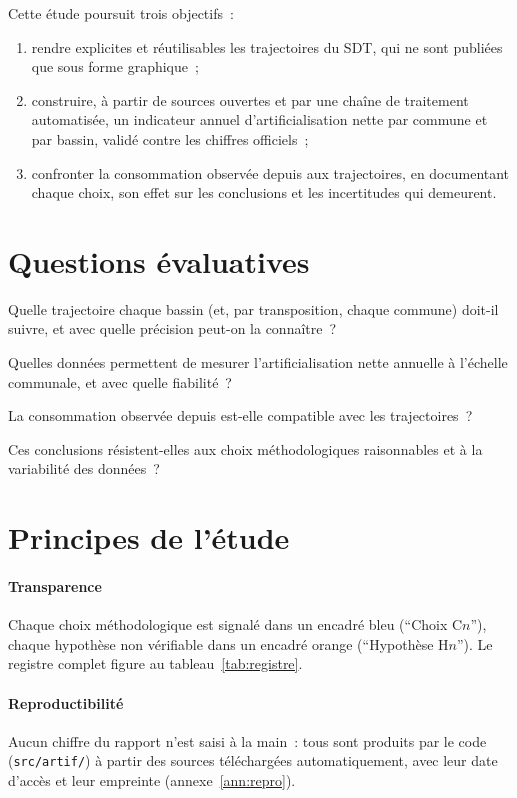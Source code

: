 \documentclass[11pt,a4paper]{report}
\newcommand{\fichier}[1]{\texttt{\small #1}}
\begin{document}
Cette étude poursuit trois objectifs~:
\begin{enumerate}[label=\textbf{O\arabic*}]
\item rendre explicites et réutilisables les trajectoires du SDT, qui ne sont publiées que sous forme graphique~;
\item construire, à partir de sources ouvertes et par une chaîne de traitement automatisée, un indicateur annuel d'artificialisation nette par commune et par bassin, validé contre les chiffres officiels~;
\item confronter la consommation observée depuis \AnneeDebutObs{} aux trajectoires, en documentant chaque choix, son effet sur les conclusions et les incertitudes qui demeurent.
\end{enumerate}

\section{Questions évaluatives}
\begin{description}[leftmargin=2.2em,style=nextline]
\item[Q1] Quelle trajectoire chaque bassin (et, par transposition, chaque commune) doit-il suivre, et avec quelle précision peut-on la connaître~?
\item[Q2] Quelles données permettent de mesurer l'artificialisation nette annuelle à l'échelle communale, et avec quelle fiabilité~?
\item[Q3] La consommation observée depuis \AnneeDebutObs{} est-elle compatible avec les trajectoires~?
\item[Q4] Ces conclusions résistent-elles aux choix méthodologiques raisonnables et à la variabilité des données~?
\end{description}

\section{Principes de l'étude}
\paragraph{Transparence} Chaque choix méthodologique est signalé dans un encadré bleu (\enquote{Choix C$n$}), chaque hypothèse non vérifiable dans un encadré orange (\enquote{Hypothèse H$n$}). Le registre complet figure au tableau~\ref{tab:registre}.
\paragraph{Reproductibilité} Aucun chiffre du rapport n'est saisi à la main~: tous sont produits par le code (\fichier{src/artif/}) à partir des sources téléchargées automatiquement, avec leur date d'accès et leur empreinte (annexe~\ref{ann:repro}).
\end{document}
